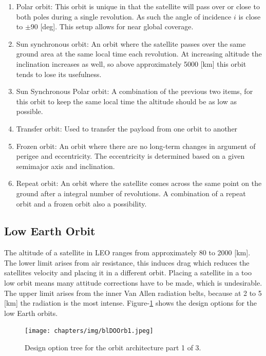 \begin{enumerate}
	\item Polar orbit:
	This orbit is unique in that the satellite will pass over or close to both poles during a single revolution. As such the angle of incidence $i$ is close to  $\pm$90 [deg]. This setup allows for near global coverage.
	\item Sun synchronous orbit:
	An orbit where the satellite passes over the same ground area at the same local time each revolution. At increasing altitude the inclination increases as well, so above approximately 5000 [km]\cite{larson} this orbit tends to lose its usefulness. 
	\item Sun Synchronous Polar orbit:
	A combination of the previous two items, for this orbit to keep the same local time the altitude should be as low as possible.
	\item Transfer orbit:
	Used to transfer the payload from one orbit to another
	\item Frozen orbit:
	An orbit where there are no long-term changes in argument of perigee and eccentricity. The eccentricity is determined based on a given semimajor axis and inclination.
	\item Repeat orbit:
	An orbit where the satellite comes across the same point on the ground after a integral number of revolutions. A combination of a repeat orbit and a frozen orbit also a possibility.
\end{enumerate}

\subsection{Low Earth Orbit}
\label{sec:blOrb1}
The altitude of a satellite in \acs{LEO} ranges from approximately 80 to 2000 [km]\cite{nasaOrbit}. The lower limit arises from air resistance, this induces drag which reduces the satellites velocity and placing it in a different orbit. Placing a satellite in a too low orbit means many attitude corrections have to be made, which is undesirable. The upper limit arises from the inner Van Allen radiation belts, because at 2 to 5 [km]\cite{sse} the radiation is the most intense. Figure-\ref{DOOrb1} shows the design options for the low Earth orbits.

\begin{figure}
\centering
  \texttt{[image: chapters/img/blDOOrb1.jpeg]}
	\caption{Design option tree for the orbit architecture part 1 of 3.}
	\label{DOOrb1}
\end{figure}

